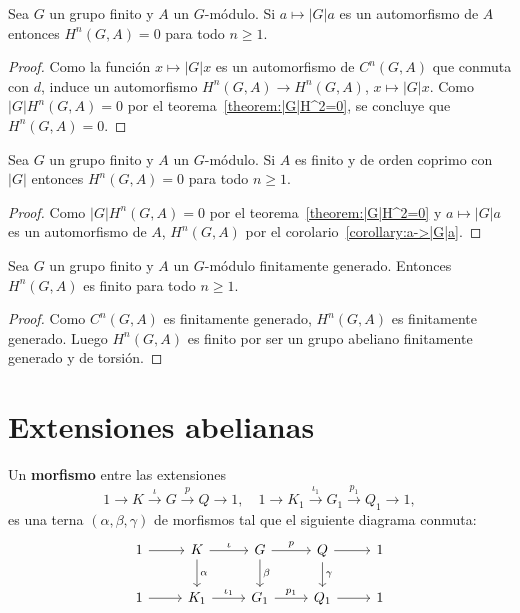 \begin{corollary}
	\label{corollary:a->|G|a}
	Sea $G$ un grupo finito y $A$ un $G$-módulo. Si $a\mapsto |G|a$ es un
	automorfismo de $A$ entonces $H^n(G,A)=0$ para todo $n\geq1$. 
\end{corollary}

\begin{proof}
	Como la función $x\mapsto |G|x$ es un automorfismo de $C^n(G,A)$ que
	conmuta con $d$, induce un automorfismo $H^n(G,A)\to H^n(G,A)$, $x\mapsto
	|G|x$. Como $|G|H^n(G,A)=0$ por el teorema~\ref{theorem:|G|H^2=0}, se
	concluye que $H^n(G,A)=0$.
\end{proof}

\begin{corollary}
	\label{corollary:H^n=0}
	Sea $G$ un grupo finito y $A$ un $G$-módulo. Si $A$ es finito y de orden
	coprimo con $|G|$ entonces $H^n(G,A)=0$ para todo $n\geq1$. 
\end{corollary}

\begin{proof}
	Como $|G|H^n(G,A)=0$ por el teorema~\ref{theorem:|G|H^2=0} y $a\mapsto
	|G|a$ es un automorfismo de $A$, $H^n(G,A)$ por el
	corolario~\ref{corollary:a->|G|a}.
\end{proof}

\begin{corollary}
	Sea $G$ un grupo finito y $A$ un $G$-módulo finitamente generado.  Entonces
	$H^n(G,A)$ es finito para todo $n\geq1$. 	
\end{corollary}

\begin{proof}
	Como $C^n(G,A)$ es finitamente generado, $H^n(G,A)$ es finitamente
	generado.  Luego $H^n(G,A)$ es finito por ser un grupo abeliano finitamente
	generado y de torsión.
\end{proof}

\section*{Extensiones abelianas}


\begin{definition}
	Un \textbf{morfismo} entre las extensiones 
	\[
	1\to K\xrightarrow{\iota}G\xrightarrow{p} Q\to1,
	\quad
	1\to K_1\xrightarrow{\iota_1}G_1\xrightarrow{p_1} Q_1\to1,
	\]
	es una terna $(\alpha,\beta,\gamma)$ de morfismos tal que el siguiente
	diagrama conmuta:
\[\begin{tikzcd}
	1 & K & G & Q & 1 \\
	1 & {K_1} & {G_1} & {Q_1} & 1
	\arrow["\iota", from=1-2, to=1-3]
	\arrow["p", from=1-3, to=1-4]
	\arrow[from=1-4, to=1-5]
	\arrow[from=1-1, to=1-2]
	\arrow[from=2-1, to=2-2]
	\arrow["{\iota_1}", from=2-2, to=2-3]
	\arrow["{p_1}", from=2-3, to=2-4]
	\arrow[from=2-4, to=2-5]
	\arrow["\alpha", from=1-2, to=2-2]
	\arrow["\beta", from=1-3, to=2-3]
	\arrow["\gamma", from=1-4, to=2-4]
\end{tikzcd}\]
\end{definition}

